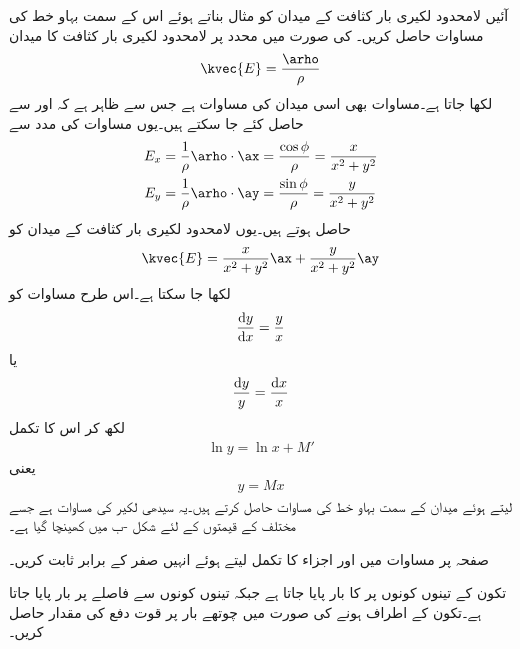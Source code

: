 آئیں لامحدود لکیری بار کثافت کے میدان کو مثال بناتے ہوئے اس  کے سمت بہاو خط کی مساوات حاصل کریں۔ کی صورت میں  محدد پر لامحدود لکیری بار کثافت کا میدان
\begin{align}\label{مساوات_کولمب_لکیری_میدان_دوبارہ}
\kvec{E}=\frac{\arho}{\rho}
\end{align}
لکھا جاتا ہے۔مساوات  بھی اسی میدان کی مساوات ہے جس سے ظاہر ہے کہ  اور  سے حاصل کئے جا سکتے ہیں۔یوں مساوات  کی مدد سے
\begin{align*}
E_x&=\frac{1}{\rho} \arho \cdot \ax=\frac{\cos \phi}{\rho}=\frac{x}{x^2+y^2}\\
E_y&=\frac{1}{\rho} \arho \cdot \ay=\frac{\sin \phi}{\rho}=\frac{y}{x^2+y^2}
\end{align*} 
حاصل ہوتے ہیں۔یوں لامحدود لکیری بار کثافت کے میدان کو
\begin{align}
\kvec{E}=\frac{x}{x^2+y^2}\ax+\frac{y}{x^2+y^2}\ay
\end{align}
لکھا جا سکتا ہے۔اس طرح مساوات  کو
\begin{align*}
\frac{\dif y}{\dif x}=\frac{y}{x}
\end{align*}
یا
\begin{align*}
\frac{\dif y}{y}=\frac{\dif x}{x}
\end{align*}
لکھ کر اس کا تکمل
\begin{align*}
\ln y = \ln x +M'
\end{align*}
یعنی
\begin{align}
y=Mx
\end{align}
لیتے ہوئے میدان کے سمت بہاو خط کی مساوات حاصل کرتے ہیں۔یہ سیدھی لکیر کی مساوات ہے جسے مختلف  کے قیمتوں کے لئے شکل -ب میں کھینچا گیا ہے۔

\newpage
{}

صفحہ  پر مساوات  میں  اور  اجزاء کا تکمل لیتے ہوئے انہیں صفر کے برابر ثابت کریں۔

تکون کے تینوں کونوں پر  کا بار پایا جاتا ہے جبکہ تینوں کونوں سے  فاصلے پر  بار پایا جاتا ہے۔تکون کے اطراف  ہونے کی صورت میں چوتھے بار پر قوت دفع  کی مقدار حاصل کریں۔

